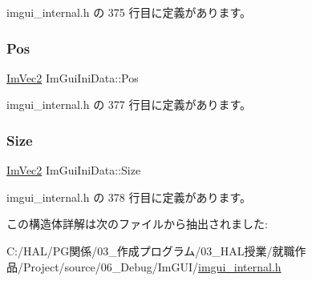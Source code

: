  imgui\+\_\+internal.\+h の 375 行目に定義があります。

\mbox{\label{struct_im_gui_ini_data_a8598c0d937901fc22f808f11f9aa6bac}} 
\subsubsection{\texorpdfstring{Pos}{Pos}}
{\footnotesize\ttfamily \mbox{\hyperlink{struct_im_vec2}{Im\+Vec2}} Im\+Gui\+Ini\+Data\+::\+Pos}



 imgui\+\_\+internal.\+h の 377 行目に定義があります。

\mbox{\label{struct_im_gui_ini_data_af3d56b3e89c45d07d7927ab95dbd86fa}} 
\subsubsection{\texorpdfstring{Size}{Size}}
{\footnotesize\ttfamily \mbox{\hyperlink{struct_im_vec2}{Im\+Vec2}} Im\+Gui\+Ini\+Data\+::\+Size}



 imgui\+\_\+internal.\+h の 378 行目に定義があります。



この構造体詳解は次のファイルから抽出されました\+:\begin{DoxyCompactItemize}
\item 
C\+:/\+H\+A\+L/\+P\+G関係/03\+\_\+作成プログラム/03\+\_\+\+H\+A\+L授業/就職作品/\+Project/source/06\+\_\+\+Debug/\+Im\+G\+U\+I/\mbox{\hyperlink{imgui__internal_8h}{imgui\+\_\+internal.\+h}}\end{DoxyCompactItemize}
